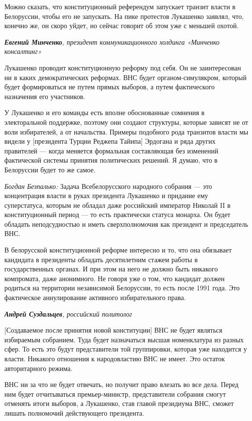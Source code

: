 Можно сказать, что конституционный референдум запускает транзит власти в Белоруссии, чтобы его не запускать. На пике протестов Лукашенко заявлял, что, конечно же, он скоро уйдет, но сейчас говорит об этом уже с меньшей охотой.

\textit{\textbf{Евгений Минченко}, президент коммуникационного холдинга «Минченко консалтинг» }

Лукашенко проводит конституционную реформу под себя. Он не заинтересован ни в каких демократических реформах. ВНС будет органом-симулякром, который будет формироваться не путем прямых выборов, а путем фактического назначения его участников.

У Лукашенко и его команды есть вполне обоснованные сомнения в электоральной поддержке, поэтому они создают структуры, которые зависят не от воли избирателей, а от начальства. Примеры подобного рода транзитов власти мы видели у [президента Турции Реджепа Тайипа] Эрдогана и ряда других правителей — когда меняется формальная составляющая без изменений фактической системы принятия политических решений. Я думаю, что в Белоруссии будет то же самое.

\textit{Богдан Безпалько:} Задача Всебелорусского народного собрания — это концентрация власти в руках президента Лукашенко и придание ему суперстатуса, которым не обладал даже российский император Николай II в конституционный период — то есть практически статуса монарха. Он будет обладать неподсудностью и иметь сверхполномочия как президент и председатель ВНС.

В белорусской конституционной реформе интересно и то, что она обязывает кандидата в президенты обладать десятилетним стажем работы в государственных органах. И при этом на него не должно быть никакого компромата, даже анонимного. Не говоря уже о том, что кандидат должен родиться на территории независимой Белоруссии, то есть после 1991 года. Это фактическое аннулирование активного избирательного права.

\textit{\textbf{Андрей Суздальцев}, российский политолог}

[Создаваемое после принятия новой конституции] ВНС не будет являться избираемым собранием. Туда будет назначаться высшая номенклатура из разных сфер. То есть это будут представители той группировки, которая уже находится у власти. Никакого отношения к народовластию ВНС не имеет. Это остаток авторитарного режима.

ВНС ни за что не будет отвечать, но получит право влезать во все дела. Перед ним будет отчитываться премьер-министр, представители собрания смогут отменять итоги выборов, а Лукашенко, став главой президиума ВНС, сможет лишать полномочий действующего президента.

